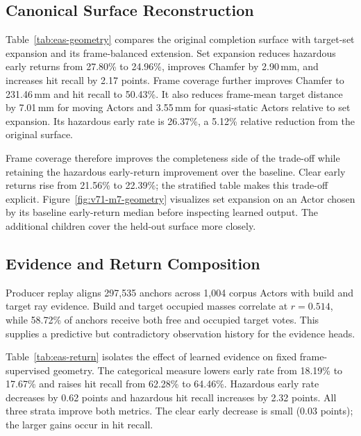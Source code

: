 \subsection{Canonical Surface Reconstruction}

Table~\ref{tab:eas-geometry} compares the original completion surface with target-set expansion and
its frame-balanced extension. Set expansion reduces hazardous early returns from 27.80\% to 24.96\%,
improves Chamfer by 2.90\,mm, and increases hit recall by 2.17 points.
Frame coverage further improves Chamfer to 231.46\,mm and hit recall to 50.43\%.
It also reduces frame-mean target distance by 7.01\,mm for moving Actors and 3.55\,mm for quasi-static Actors
relative to set expansion. Its hazardous early rate is 26.37\%, a 5.12\% relative reduction from the original surface.



Frame coverage therefore improves the completeness side of the trade-off while retaining the hazardous
early-return improvement over the baseline. Clear early returns rise from 21.56\% to 22.39\%;
the stratified table makes this trade-off explicit.
Figure~\ref{fig:v71-m7-geometry} visualizes set expansion on an Actor chosen by its baseline early-return
median before inspecting learned output. The additional children cover the held-out surface more closely.


\subsection{Evidence and Return Composition}

Producer replay aligns 297,535 anchors across 1,004 corpus Actors with build and target ray evidence.
Build and target occupied masses correlate at $r=0.514$, while 58.72\% of anchors receive both free
and occupied target votes. This supplies a predictive but contradictory observation history for the evidence heads.

Table~\ref{tab:eas-return} isolates the effect of learned evidence on fixed frame-supervised geometry.
The categorical measure lowers early rate from 18.19\% to 17.67\% and raises hit recall from 62.28\% to 64.46\%.
Hazardous early rate decreases by 0.62 points and hazardous hit recall increases by 2.32 points.
All three strata improve both metrics. The clear early decrease is small (0.03 points);
the larger gains occur in hit recall.



